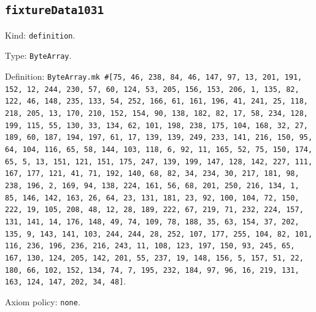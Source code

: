 \documentclass[11pt]{article}
\begin{document}
\subsection*{\texttt{fixtureData1031}}
\noindent Kind: \texttt{definition}.\par
\noindent Type: \texttt{ByteArray}.\par
\noindent Definition: \texttt{ByteArray.mk \#[75, 46, 238, 84, 46, 147, 97, 13, 201, 191, 152, 12, 244, 230, 57, 60, 124, 53, 205, 156, 153, 206, 1, 135, 82, 122, 46, 148, 235, 133, 54, 252, 166, 61, 161, 196, 41, 241, 25, 118, 218, 205, 13, 170, 210, 152, 154, 90, 138, 182, 82, 17, 58, 234, 128, 199, 115, 55, 130, 33, 134, 62, 101, 198, 238, 175, 104, 168, 32, 27, 189, 60, 187, 194, 197, 61, 17, 139, 139, 249, 233, 141, 216, 150, 95, 64, 104, 116, 65, 58, 144, 103, 118, 6, 92, 11, 165, 52, 75, 150, 174, 65, 5, 13, 151, 121, 151, 175, 247, 139, 199, 147, 128, 142, 227, 111, 167, 177, 121, 41, 71, 192, 140, 68, 82, 34, 234, 30, 217, 181, 98, 238, 196, 2, 169, 94, 138, 224, 161, 56, 68, 201, 250, 216, 134, 1, 85, 146, 142, 163, 26, 64, 23, 131, 181, 23, 92, 100, 104, 72, 150, 222, 19, 105, 208, 48, 12, 28, 189, 222, 67, 219, 71, 232, 224, 157, 131, 141, 14, 176, 148, 49, 74, 109, 78, 188, 35, 63, 154, 37, 202, 135, 9, 143, 141, 103, 244, 244, 28, 252, 107, 177, 255, 104, 82, 101, 116, 236, 196, 236, 216, 243, 11, 108, 123, 197, 150, 93, 245, 65, 167, 130, 124, 205, 142, 201, 55, 237, 19, 148, 156, 5, 157, 51, 22, 180, 66, 102, 152, 134, 74, 7, 195, 232, 184, 97, 96, 16, 219, 131, 163, 124, 147, 202, 34, 48]}.\par
\noindent Axiom policy: \texttt{none}.\par
\end{document}

